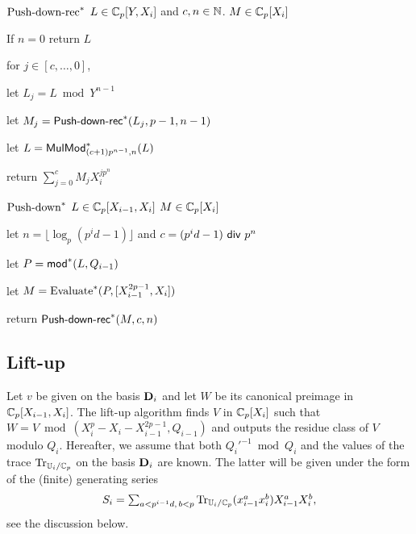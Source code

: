 \begin{algorithm}
  {${\sf \text{Push-down-rec}}^\ast$}
  {$L\in\mathbb{C}_p[Y,X_i]$ and $c,n\in\mathbb{N}$.}
  {$M\in \mathbb{C}_p[X_i]$}
\item If $n=0$ return $L$
\item\label{pdt:loop} for $j\in [c,\dots,0]$,
  \begin{itemize*}
  \item let $L_j = L \bmod Y^{n-1}$
  \item let $M_j=\text{\sf Push-down-rec}^\ast(L_j,p-1,n-1)$
  \item let $L = {\sf MulMod}_{(c+1)p^{n-1},n}^\ast(L)$
  \end{itemize*}
\item return $\sum_{j=0}^{c} M_j X_i^{jp^n}$
\end{algorithm}
\begin{algorithm}
  {${\sf \text{Push-down}}^\ast$} {$L\in \mathbb{C}_p[X_{i-1},X_i]$} {$M \in \mathbb{C}_p[X_i]$}
\item let $n=\lfloor \log_p(p^id-1) \rfloor$ and $c=(p^id-1) {\sf~div~} p^n$
\item let $P={\sf mod}^\ast(L,Q_{i-1})$
\item let $M = \text{Evaluate}^\ast(P,[X_{i-1}^{2p-1},X_i])$
\item return $\text{{\sf Push-down-rec}}^\ast(M,c,n)$
\end{algorithm}


\subsection{Lift-up}
\label{sec:level-embedding:lift-up}

Let $v$ be given on the basis $\mathbf{D}_i$ and let $W$ be its canonical
preimage in $\mathbb{C}_p[X_{i-1},X_i]$.  The lift-up algorithm finds $V$ in
$\mathbb{C}_p[X_i]$ such that $W=V \bmod (X_i^p-X_i-X_{i-1}^{2p-1},Q_{i-1})$
and outputs the residue class of $V$ modulo $Q_i$. Hereafter, we
assume that both $Q_i'^{-1} \bmod Q_i$ and the values of the trace
$\operatorname{Tr}_{\mathbb{U}_i/\mathbb{C}_p}$ on the basis $\mathbf{D}_i$ are known.  The latter will be
given under the form of the (finite) generating series
$$\begin{array}{c}
  S_i=\sum_{a < p^{i-1}d,\, b < p} \operatorname{Tr}_{\mathbb{U}_i/\mathbb{C}_p}(x_{i-1}^ax_i^b)X_{i-1}^a X_i^b,
\end{array}
$$ 
see the discussion below.

